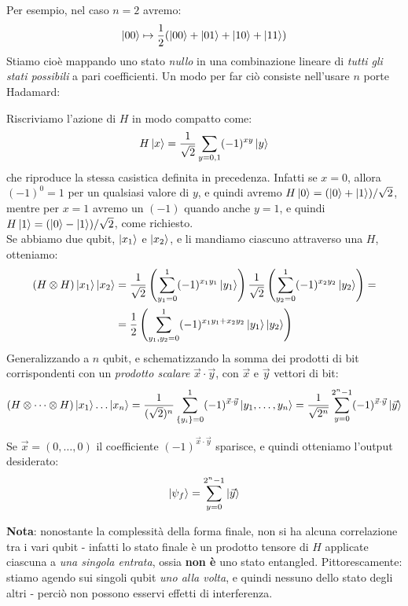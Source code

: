 \documentclass[../../InformazioneQuantistica.tex]{subfiles}
\begin{document}
Per esempio, nel caso $n=2$ avremo:
\begin{align*}
\Ket{00} \mapsto \frac{1}{2}(\Ket{00}+\Ket{01}+\Ket{10}+\Ket{11})
\end{align*}
Stiamo cioè mappando uno stato \textit{nullo} in una combinazione lineare di \textit{tutti gli stati possibili} a pari coefficienti. Un modo per far ciò consiste nell'usare $n$ porte Hadamard:



Riscriviamo l'azione di $H$ in modo compatto come:
\begin{align*}
H\Ket{x} = \frac{1}{\sqrt{2}} \sum_{y=0,1} (-1)^{xy} \Ket{y}
\end{align*}
che riproduce la stessa casistica definita in precedenza. Infatti se $x = 0$, allora $(-1)^0=1$ per un qualsiasi valore di $y$, e quindi avremo $H\Ket{0} = (\Ket{0}+\Ket{1})/\sqrt{2}$, mentre per $x=1$ avremo un $(-1)$ quando anche $y=1$, e quindi $H\Ket{1}=(\Ket{0}-\Ket{1})/\sqrt{2}$, come richiesto.\\

Se abbiamo due qubit, $\Ket{x_1}$ e $\Ket{x_2}$, e li mandiamo ciascuno attraverso una $H$, otteniamo:
\begin{align*}
(H\otimes H)\Ket{x_1} \Ket{x_2} &= \frac{1}{\sqrt{2}}\left(\sum_{y_1=0}^1 (-1)^{x_1 y_1} \Ket{y_1}\right)\frac{1}{\sqrt{2}}\left(\sum_{y_2=0}^1(-1)^{x_2y_2}\Ket{y_2}\right)=\\
&=\frac{1}{2} \left(\sum_{y_1, y_2=0}^1 (-1)^{x_1 y_1 + x_2y_2} \Ket{y_1}\Ket{y_2}\right)
\end{align*}
Generalizzando a $n$ qubit, e schematizzando la somma dei prodotti di bit corrispondenti con un \textit{prodotto scalare} $\vec{x}\cdot \vec{y}$, con $\vec{x}$ e $\vec{y}$ vettori di bit:
\begin{align*}
(H\otimes \dots \otimes H) \Ket{x_1}\dots \Ket{x_n} = \frac{1}{(\sqrt{2})^n} \sum_{\{y_i\}=0}^1 (-1)^{\vec{x}\cdot \vec{y}}\Ket{y_1, \dots, y_n} = \frac{1}{\sqrt{2^n}} \sum_{y=0}^{2^n-1} (-1)^{\vec{x}\cdot\vec{y}} \Ket{\vec{y}}
\end{align*}

Se $\vec{x}=(0,\dots,0)$  il coefficiente $(-1)^{\vec{x}\cdot \vec{y}}$ sparisce, e quindi otteniamo l'output desiderato:
\begin{align*}
\Ket{\psi_{f}}=\sum_{y=0}^{2^n-1} \Ket{\vec{y}}
\end{align*}

\textbf{Nota}: nonostante la complessità della forma finale, non si ha alcuna correlazione tra i vari qubit - infatti lo stato finale è un prodotto tensore di $H$ applicate ciascuna a \textit{una singola entrata}, ossia \textbf{non è} uno stato entangled. Pittorescamente: stiamo agendo sui singoli qubit \textit{uno alla volta}, e quindi nessuno  dello stato degli altri - perciò non possono esservi effetti di interferenza.
\end{document}

